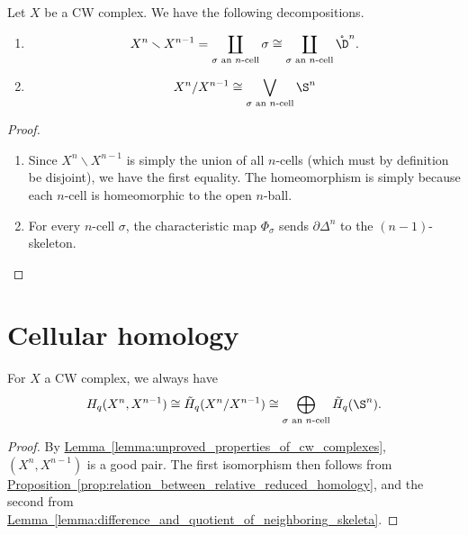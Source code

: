 \documentclass[main.tex]{subfiles}
\begin{document}
\begin{lemma}
  \label{lemma:difference_and_quotient_of_neighboring_skeleta}
  Let $X$ be a CW complex. We have the following decompositions.
  \begin{enumerate}
    \item
      \begin{equation*}
        X^{n} \smallsetminus X^{n-1} = \coprod_{\sigma \text{ an $n$-cell}} \sigma \cong \coprod_{\sigma \text{ an $n$-cell}} \mathring{\D}^{n}.
      \end{equation*}

    \item
      \begin{equation*}
        X^{n}/X^{n-1} \cong \bigvee_{\sigma\text{ an $n$-cell}} \S^{n}
      \end{equation*}
  \end{enumerate}
\end{lemma}
\begin{proof}
  \leavevmode
  \begin{enumerate}
    \item Since $X^{n} \smallsetminus X^{n-1}$ is simply the union of all $n$-cells (which must by definition be disjoint), we have the first equality. The homeomorphism is simply because each $n$-cell is homeomorphic to the open $n$-ball.

    \item For every $n$-cell $\sigma$, the characteristic map $\Phi_{\sigma}$ sends $\partial \Delta^{n}$ to the $(n-1)$-skeleton.
  \end{enumerate}
\end{proof}

\section{Cellular homology}
\label{sec:cellular_homology}

\begin{lemma}
  \label{lemma:relative_homology_of_skeleta_trivial}
  For $X$ a CW complex, we always have
  \begin{equation*}
    H_{q}(X^{n}, X^{n-1}) \cong \tilde{H}_{q}(X^{n}/X^{n-1}) \cong \bigoplus_{\sigma \text{ an $n$-cell}} \tilde{H}_{q}(\S^{n}).
  \end{equation*}
\end{lemma}
\begin{proof}
  By \hyperref[lemma:unproved_properties_of_cw_complexes]{Lemma~\ref*{lemma:unproved_properties_of_cw_complexes}}, $(X^{n}, X^{n-1})$ is a good pair. The first isomorphism then follows from \hyperref[prop:relation_between_relative_reduced_homology]{Proposition~\ref*{prop:relation_between_relative_reduced_homology}}, and the second from \hyperref[lemma:difference_and_quotient_of_neighboring_skeleta]{Lemma~\ref*{lemma:difference_and_quotient_of_neighboring_skeleta}}.
\end{proof}
\end{document}
